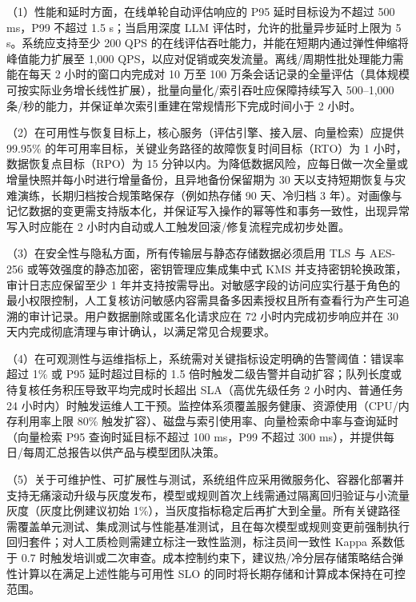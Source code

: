 （1）性能和延时方面，在线单轮自动评估响应的 P95 延时目标设为不超过 500 ms，P99 不超过 1.5 s；当启用深度 LLM 评估时，允许的批量异步延时上限为 5 s。系统应支持至少 200 QPS 的在线评估吞吐能力，并能在短期内通过弹性伸缩将峰值能力扩展至 1,000 QPS，以应对促销或突发流量。离线/周期性批处理能力需能在每天 2 小时的窗口内完成对 10 万至 100 万条会话记录的全量评估（具体规模可按实际业务增长线性扩展），批量向量化/索引吞吐应保障持续写入 500–1,000 条/秒的能力，并保证单次索引重建在常规情形下完成时间小于 2 小时。

（2）在可用性与恢复目标上，核心服务（评估引擎、接入层、向量检索）应提供 99.95\% 的年可用率目标，关键业务路径的故障恢复时间目标（RTO）为 1 小时，数据恢复点目标（RPO）为 15 分钟以内。为降低数据风险，应每日做一次全量或增量快照并每小时进行增量备份，且异地备份保留期为 30 天以支持短期恢复与灾难演练，长期归档按合规策略保存（例如热存储 90 天、冷归档 3 年）。对画像与记忆数据的变更需支持版本化，并保证写入操作的幂等性和事务一致性，出现异常写入时应能在 2 小时内自动或人工触发回滚/修复流程完成初步处置。

（3）在安全性与隐私方面，所有传输层与静态存储数据必须启用 TLS 与 AES-256 或等效强度的静态加密，密钥管理应集成集中式 KMS 并支持密钥轮换政策，审计日志应保留至少 1 年并支持按需导出。对敏感字段的访问应实行基于角色的最小权限控制，人工复核访问敏感内容需具备多因素授权且所有查看行为产生可追溯的审计记录。用户数据删除或匿名化请求应在 72 小时内完成初步响应并在 30 天内完成彻底清理与审计确认，以满足常见合规要求。

（4）在可观测性与运维指标上，系统需对关键指标设定明确的告警阈值：错误率超过 1\% 或 P95 延时超过目标的 1.5 倍时触发二级告警并自动扩容；队列长度或待复核任务积压导致平均完成时长超出 SLA（高优先级任务 2 小时内、普通任务 24 小时内）时触发运维人工干预。监控体系须覆盖服务健康、资源使用（CPU/内存利用率上限 80\% 触发扩容）、磁盘与索引使用率、向量检索命中率与查询延时（向量检索 P95 查询时延目标不超过 100 ms，P99 不超过 300 ms），并提供每日/每周汇总报告以供产品与模型团队决策。

（5）关于可维护性、可扩展性与测试，系统组件应采用微服务化、容器化部署并支持无痛滚动升级与灰度发布，模型或规则首次上线需通过隔离回归验证与小流量灰度（灰度比例建议初始 1\%），当灰度指标稳定后再扩大到全量。所有关键路径需覆盖单元测试、集成测试与性能基准测试，且在每次模型或规则变更前强制执行回归套件；对人工质检则需建立标注一致性监测，标注员间一致性 Kappa 系数低于 0.7 时触发培训或二次审查。成本控制约束下，建议热/冷分层存储策略结合弹性计算以在满足上述性能与可用性 SLO 的同时将长期存储和计算成本保持在可控范围。

